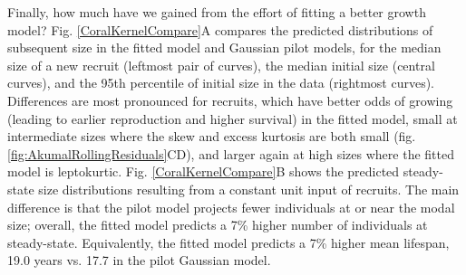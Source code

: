 \documentclass[11pt]{article}
\begin{document}
{Finally, how much have we gained from the effort of fitting a better growth model? Fig. \ref{CoralKernelCompare}A
compares the predicted distributions of subsequent size in the fitted model and Gaussian pilot models, for the median size of a new recruit 
(leftmost pair of curves), the median initial size (central curves), and the 95th percentile of initial size in the data (rightmost
curves). Differences are most pronounced for recruits, which have better odds of growing (leading to earlier reproduction and higher
survival) in the fitted model, small at intermediate sizes where the skew and excess kurtosis are both small (fig. \ref{fig:AkumalRollingResiduals}CD),
and larger again at high sizes where the fitted model is leptokurtic. Fig. \ref{CoralKernelCompare}B shows the predicted steady-state size
distributions resulting from a constant unit input of recruits. The main difference is that the pilot model projects fewer individuals at
or near the modal size; overall, the fitted model predicts a 7\% higher number of individuals at steady-state. Equivalently, the fitted
model predicts a 7\% higher mean lifespan,  19.0 years vs. 17.7 in the pilot Gaussian model. 
 

}
\end{document}
